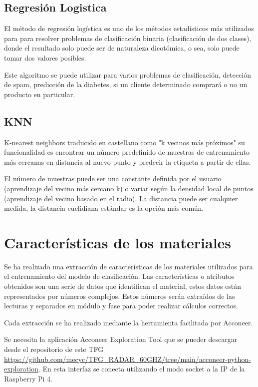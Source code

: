 \subsection{Regresión Logistica}

El método de regresión logística es uno de los métodos estadísticos más utilizados para para resolver problemas de clasificación binaria (clasificación de dos clases), donde el resultado solo puede ser de naturaleza dicotómica, o sea, solo puede tomar dos valores posibles.

Este algoritmo se puede utilizar para varios problemas de clasificación, detección de spam, predicción de la diabetes, si un cliente determinado comprará o no un producto en particular.

\subsection{KNN}

K-nearest neighbors traducido en castellano como "k vecinos más próximos" su funcionalidad es encontrar un número predefinido de muestras de entrenamiento más cercanas en distancia al nuevo punto y predecir la etiqueta a partir de ellas. 


El número de muestras puede ser una constante definida por el usuario (aprendizaje del vecino más cercano k) o variar según la densidad local de puntos (aprendizaje del vecino basado en el radio). La distancia puede ser cualquier medida, la distancia euclidiana estándar es la opción más común.

\section{Características de los materiales}

Se ha realizado una extracción de características de los materiales utilizados para el entrenamiento del modelo de clasificación. Las características o atributos obtenidos son una serie de datos que identifican el material, estos datos están representados por números complejos. Estos números serán extraídos de las lecturas y separados en módulo y fase para poder realizar cálculos correctos.

Cada extracción se ha realizado mediante la herramienta facilitada por Acconeer.



Se necesita la aplicación Acconeer Exploration Tool que se pueder descargar desde el repositorio de este TFG \url{https://github.com/mecyc/TFG_RADAR_60GHZ/tree/main/acconeer-python-exploration}. En esta interfaz se conecta utilizando el modo socket a la IP de la Raspberry Pi 4.
 

